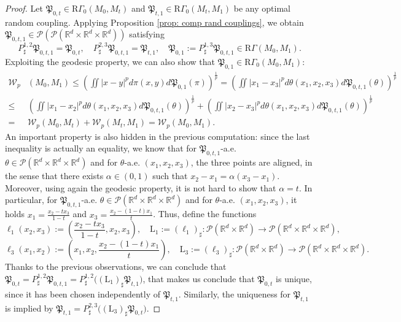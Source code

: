 \documentclass[10pt,leqno]{amsart}
\numberwithin{equation}{section}
\newcommand{\R}{\mathbb{R}}
\newcommand{\PP}{\mathcal{P}}
\begin{document}
\begin{proof}
    Let $\mathfrak{P}_{0,t} \in \mathrm{R}\Gamma_0(M_0,M_t)$ and $\mathfrak{P}_{t,1}\in \mathrm{R}\Gamma_{0}(M_t,M_1)$ be any optimal random coupling. Applying Proposition \ref{prop: comp rand couplings}, we obtain $\mathfrak{P}_{0,t,1}\in \PP(\PP(\R^d \times \R^d \times \R^d))$ satisfying
    \begin{equation}
        P^{1,2}_\sharp  \mathfrak{P}_{0,t,1} =\mathfrak{P}_{0,t}, \quad P^{2,3}_\sharp  \mathfrak{P}_{0,t,1} = \mathfrak{P}_{t,1}, \quad \mathfrak{P}_{0,1}:=P^{1,3}_\sharp  \mathfrak{P}_{0,t,1} \in \mathrm{R}\Gamma(M_0,M_1).
    \end{equation}
    Exploiting the geodesic property, we can also show that $\mathfrak{P}_{0,1}\in \mathrm{R}\Gamma_0(M_0,M_1)$:
    \begin{align*}
        \mathcal{W}_p& (M_0,M_1) \leq \left(\iint |x-y|^p d\pi(x,y) d\mathfrak{P}_{0,1}(\pi)\right)^{\frac{1}{p}} = \left( \iint |x_1-x_3|^p d\theta(x_1,x_2,x_3) d\mathfrak{P}_{0,t,1}(\theta) \right)^{\frac{1}{p}}
        \\
        \leq &
        \left(\iint  |x_1-x_2|^pd\theta(x_1,x_2,x_3) d\mathfrak{P}_{0,t,1}(\theta) \right)^{\frac{1}{p}} + \left(\iint  |x_2-x_3|^pd\theta(x_1,x_2,x_3) d\mathfrak{P}_{0,t,1}(\theta) \right)^{\frac{1}{p}} 
        \\
        = & \mathcal{W}_p(M_0,M_t) + \mathcal{W}_p(M_t,M_1) = \mathcal{W}_{p}(M_0,M_1).
    \end{align*}
    An important property is also hidden in the previous computation: since the last inequality is actually an equality, we know that for $\mathfrak{P}_{0,t,1}$-a.e. $\theta\in \PP(\R^d \times \R^d \times \R^d)$ and for $\theta$-a.e. $(x_1,x_2,x_3)$, the three points are aligned, in the sense that there exists $\alpha\in(0,1)$ such that $x_2 - x_1 = \alpha(x_3-x_1)$. Moreover, using again the geodesic property, it is not hard to show that $\alpha = t$. In particular, for $\mathfrak{P}_{0,t,1}$-a.e. $\theta\in \PP(\R^d \times \R^d \times \R^d)$ and for $\theta$-a.e. $(x_1,x_2,x_3)$, it holds $x_1 = \frac{x_2 - t x_3}{1-t}$ and $x_3 = \frac{x_2 - (1-t)x_1}{t}$. Thus, define the functions
    \[\ell_1(x_2,x_3) := \left(  \frac{x_2 - t x_3}{1-t},x_2,x_3 \right), \quad \mathrm{L}_1:= (\ell_1)_\sharp : \PP(\R^d \times \R^d) \to \PP(\R^d \times \R^d \times \R^d), \]
    \[\ell_3(x_1,x_2) := \left(  x_1,x_2,\frac{x_2 - (1-t)x_1}{t} \right), \quad \mathrm{L}_3:= (\ell_3)_\sharp : \PP(\R^d \times \R^d) \to \PP(\R^d \times \R^d \times \R^d).\]
    Thanks to the previous observations, we can conclude that $\mathfrak{P}_{0,t} = P^{1,2}_\sharp \mathfrak{P}_{0,t,1} = P^{1,2}_\sharp \big( (\mathrm{L}_1)_\sharp  \mathfrak{P}_{t,1} \big)$, that makes us conclude that $\mathfrak{P}_{0,t}$ is unique, since it has been chosen independently of $\mathfrak{P}_{t,1}$. Similarly, the uniqueness for $\mathfrak{P}_{t,1}$ is implied by $\mathfrak{P}_{t,1} = P^{2,3}_\sharp \big( (\mathrm{L}_3)_\sharp  \mathfrak{P}_{0,t} \big)$.


\end{proof}
\end{document}
